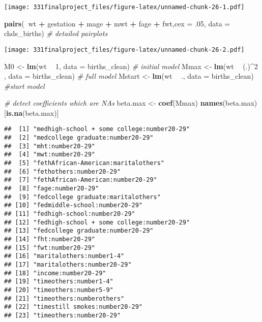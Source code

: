 \documentclass[]{article}
\newenvironment{Shaded}{\begin{snugshade}}{\end{snugshade}}
\newcommand{\KeywordTok}[1]{\textcolor[rgb]{0.13,0.29,0.53}{\textbf{#1}}}
\newcommand{\DataTypeTok}[1]{\textcolor[rgb]{0.13,0.29,0.53}{#1}}
\newcommand{\DecValTok}[1]{\textcolor[rgb]{0.00,0.00,0.81}{#1}}
\newcommand{\StringTok}[1]{\textcolor[rgb]{0.31,0.60,0.02}{#1}}
\newcommand{\CommentTok}[1]{\textcolor[rgb]{0.56,0.35,0.01}{\textit{#1}}}
\newcommand{\OperatorTok}[1]{\textcolor[rgb]{0.81,0.36,0.00}{\textbf{#1}}}
\newcommand{\NormalTok}[1]{#1}
\begin{document}
\texttt{[image: 331finalproject\_files/figure-latex/unnamed-chunk-26-1.pdf]}

\begin{Shaded}
\begin{Highlighting}[]
\KeywordTok{pairs}\NormalTok{(}\OperatorTok{~}\NormalTok{wt }\OperatorTok{+}\StringTok{ }\NormalTok{gestation }\OperatorTok{+}\StringTok{ }\NormalTok{mage }\OperatorTok{+}\StringTok{ }\NormalTok{mwt }\OperatorTok{+}\StringTok{ }\NormalTok{fage }\OperatorTok{+}\StringTok{ }\NormalTok{fwt,}\DataTypeTok{cex =}\NormalTok{ .}\DecValTok{05}\NormalTok{,  }\DataTypeTok{data =}\NormalTok{ chds_births) }\CommentTok{# detailed pairplots}
\end{Highlighting}
\end{Shaded}

\texttt{[image: 331finalproject\_files/figure-latex/unnamed-chunk-26-2.pdf]}

\begin{Shaded}
\begin{Highlighting}[]
\NormalTok{M0 <-}\StringTok{ }\KeywordTok{lm}\NormalTok{(wt }\OperatorTok{~}\StringTok{ }\DecValTok{1}\NormalTok{, }\DataTypeTok{data =}\NormalTok{ births_clean) }\CommentTok{# initial model}
\NormalTok{Mmax <-}\StringTok{ }\KeywordTok{lm}\NormalTok{(wt }\OperatorTok{~}\StringTok{ }\NormalTok{(.)}\OperatorTok{^}\DecValTok{2}\NormalTok{ , }\DataTypeTok{data =}\NormalTok{ births_clean) }\CommentTok{# full model}
\NormalTok{Mstart <-}\StringTok{ }\KeywordTok{lm}\NormalTok{(wt }\OperatorTok{~}\StringTok{ }\NormalTok{., }\DataTypeTok{data =}\NormalTok{ births_clean) }\CommentTok{#start model}

\CommentTok{# detect coefficients which are NAs}
\NormalTok{beta.max <-}\StringTok{ }\KeywordTok{coef}\NormalTok{(Mmax)}
\KeywordTok{names}\NormalTok{(beta.max)[}\KeywordTok{is.na}\NormalTok{(beta.max)]}
\end{Highlighting}
\end{Shaded}

\begin{verbatim}
##  [1] "medhigh-school + some college:number20-29"
##  [2] "medcollege graduate:number20-29"          
##  [3] "mht:number20-29"                          
##  [4] "mwt:number20-29"                          
##  [5] "fethAfrican-American:maritalothers"       
##  [6] "fethothers:number20-29"                   
##  [7] "fethAfrican-American:number20-29"         
##  [8] "fage:number20-29"                         
##  [9] "fedcollege graduate:maritalothers"        
## [10] "fedmiddle-school:number20-29"             
## [11] "fedhigh-school:number20-29"               
## [12] "fedhigh-school + some college:number20-29"
## [13] "fedcollege graduate:number20-29"          
## [14] "fht:number20-29"                          
## [15] "fwt:number20-29"                          
## [16] "maritalothers:number1-4"                  
## [17] "maritalothers:number20-29"                
## [18] "income:number20-29"                       
## [19] "timeothers:number1-4"                     
## [20] "timeothers:number5-9"                     
## [21] "timeothers:numberothers"                  
## [22] "timestill smokes:number20-29"             
## [23] "timeothers:number20-29"
\end{verbatim}
\end{document}
